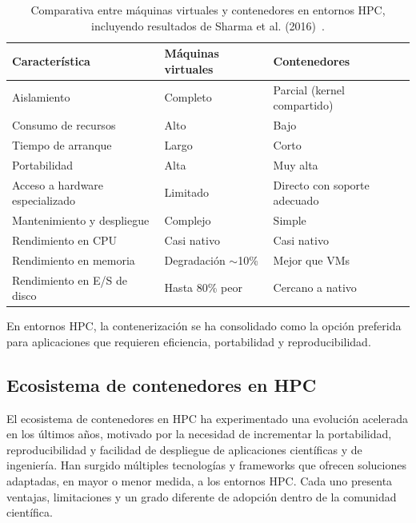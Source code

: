 \begin{table}[ht]
    \centering
    \begin{tabular}{p{4cm} p{4cm} p{4cm}}
        \toprule
        \textbf{Característica}         & \textbf{Máquinas virtuales} & \textbf{Contenedores}        \\
        \midrule
        Aislamiento                     & Completo                    & Parcial (kernel compartido)  \\
        Consumo de recursos             & Alto                        & Bajo                         \\
        Tiempo de arranque              & Largo                       & Corto                        \\
        Portabilidad                    & Alta                        & Muy alta                     \\
        Acceso a hardware especializado & Limitado                    & Directo con soporte adecuado \\
        Mantenimiento y despliegue      & Complejo                    & Simple                       \\
        Rendimiento en CPU              & Casi nativo                 & Casi nativo                  \\
        Rendimiento en memoria          & Degradación $\sim$10\%      & Mejor que VMs                \\
        Rendimiento en E/S de disco     & Hasta 80\% peor             & Cercano a nativo             \\
        \bottomrule
    \end{tabular}
    \caption{Comparativa entre máquinas virtuales y contenedores en entornos HPC, incluyendo resultados de Sharma et al. (2016)~\cite{sharma2016containers}.}
    \label{tab:vm_vs_container}
\end{table}

En entornos HPC, la contenerización se ha consolidado como la opción preferida para aplicaciones que requieren eficiencia, portabilidad y reproducibilidad.

\subsection{Ecosistema de contenedores en HPC}\label{subsec:ecosistema_contenedores}

El ecosistema de contenedores en \acs{HPC} ha experimentado una evolución acelerada en los últimos años, motivado por la necesidad de incrementar la portabilidad, reproducibilidad y facilidad de despliegue de aplicaciones científicas y de ingeniería. Han surgido múltiples tecnologías y frameworks que ofrecen soluciones adaptadas, en mayor o menor medida, a los entornos HPC. Cada uno presenta ventajas, limitaciones y un grado diferente de adopción dentro de la comunidad científica.

